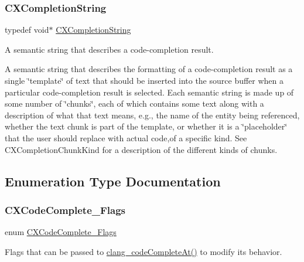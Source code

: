 \subsubsection{\texorpdfstring{C\+X\+Completion\+String}{CXCompletionString}}
{\footnotesize\ttfamily typedef void$\ast$ \mbox{\hyperlink{group__CINDEX__CODE__COMPLET_gafea23a43a60ec3b4f3bedccfbb76883a}{C\+X\+Completion\+String}}}



A semantic string that describes a code-\/completion result. 

A semantic string that describes the formatting of a code-\/completion result as a single \char`\"{}template\char`\"{} of text that should be inserted into the source buffer when a particular code-\/completion result is selected. Each semantic string is made up of some number of \char`\"{}chunks\char`\"{}, each of which contains some text along with a description of what that text means, e.\+g., the name of the entity being referenced, whether the text chunk is part of the template, or whether it is a \char`\"{}placeholder\char`\"{} that the user should replace with actual code,of a specific kind. See {\ttfamily C\+X\+Completion\+Chunk\+Kind} for a description of the different kinds of chunks. 

\subsection{Enumeration Type Documentation}
\mbox{\label{group__CINDEX__CODE__COMPLET_gaaad70639b9973354626101151db4154b}} 
\subsubsection{\texorpdfstring{C\+X\+Code\+Complete\+\_\+\+Flags}{CXCodeComplete\_Flags}}
{\footnotesize\ttfamily enum \mbox{\hyperlink{group__CINDEX__CODE__COMPLET_gaaad70639b9973354626101151db4154b}{C\+X\+Code\+Complete\+\_\+\+Flags}}}



Flags that can be passed to {\ttfamily \mbox{\hyperlink{group__CINDEX__CODE__COMPLET_ga50fedfa85d8d1517363952f2e10aa3bf}{clang\+\_\+code\+Complete\+At()}}} to modify its behavior. 

